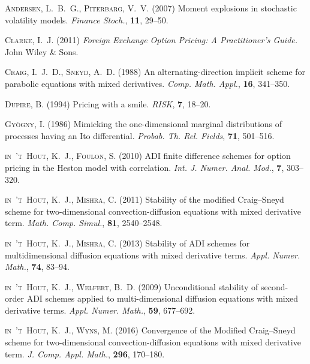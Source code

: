 \documentclass[10pt]{article}
\begin{document}
\vfill\eject
\begin{thebibliography}{99}

 \textsc{Andersen, L.~B.~G., Piterbarg, V.~V.} (2007)
Moment explosions in stochastic volatility models.
\textit{Finance Stoch.}, \textbf{11}, 29--50.

 \textsc{Clarke, I.~J.} (2011)
\textit{Foreign Exchange Option Pricing: A Practitioner's Guide.}
John Wiley \& Sons.

 \textsc{Craig, I.~J.~D., Sneyd, A.~D.} (1988)
An alternating-direction implicit scheme for parabolic equations
with mixed derivatives.
\textit{Comp. Math. Appl.}, \textbf{16}, 341--350.

 \textsc{Dupire, B.} (1994)
Pricing with a smile. 
\textit{RISK}, \textbf{7}, 18--20.


 \textsc{Gy\"ogny, I.} (1986)
Mimicking the one-dimensional marginal distributions of processes having an Ito differential.
\textit{Probab. Th. Rel. Fields}, \textbf{71}, 501--516.

 \textsc{in~'t~Hout, K.~J., Foulon, S.} (2010)
ADI finite difference schemes for option pricing in the Heston model
with correlation.
\textit{Int. J. Numer. Anal. Mod.}, \textbf{7}, 303--320.

 \textsc{in~'t~Hout, K.~J., Mishra, C.} (2011)
Stability of the modified Craig--Sneyd scheme for
two-dimensional convection-diffusion equations with mixed
derivative term.
\textit{Math. Comp. Simul.}, \textbf{81}, 2540--2548.

 \textsc{in~'t~Hout, K.~J., Mishra, C.} (2013)
Stability of ADI schemes for multidimensional diffusion equations
with mixed derivative terms.
\textit{Appl. Numer. Math.}, \textbf{74}, 83--94.

 \textsc{in~'t~Hout, K.~J., Welfert, B.~D.} (2009)
Unconditional stability of second-order ADI schemes applied to
multi-dimensional diffusion equations with mixed derivative terms.
\textit{Appl. Numer. Math.}, \textbf{59}, 677--692.

 \textsc{in~'t~Hout, K.~J., Wyns, M.} (2016)
Convergence of the Modified Craig--Sneyd scheme for two-dimensional convection-diffusion equations with mixed derivative term.
\textit{J. Comp. Appl. Math.}, \textbf{296}, 170--180.


\end{thebibliography}
\end{document}
